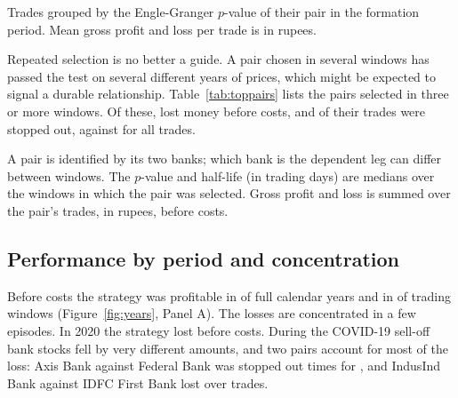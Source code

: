 \documentclass[11pt]{article}
\begin{document}
\begin{table}[tbp]
\centering
\caption{Trade outcomes by formation-period \texorpdfstring{$p$}{p}-value}
\label{tab:pvalue}
\small

\begin{tablenote}
Trades grouped by the Engle-Granger $p$-value of their pair in the formation period.
Mean gross profit and loss per trade is in rupees.
\end{tablenote}
\end{table}

Repeated selection is no better a guide. A pair chosen in several windows has passed
the test on several different years of prices, which might be expected to signal a
durable relationship. Table~\ref{tab:toppairs} lists the \NRepeat{} pairs selected
in three or more windows. Of these, \NRepeatLoss{} lost money before costs, and
\RepeatStopShare{} of their trades were stopped out, against \ShareStop{} for all
trades.

\begin{table}[tbp]
\centering
\caption{Pairs selected in three or more windows}
\label{tab:toppairs}
\footnotesize
\setlength{\tabcolsep}{4.5pt}

\begin{tablenote}
A pair is identified by its two banks; which bank is the dependent leg can differ
between windows. The $p$-value and half-life (in trading days) are medians over the
windows in which the pair was selected. Gross profit and loss is summed over the
pair's trades, in rupees, before costs.
\end{tablenote}
\end{table}

\subsection{Performance by period and concentration}\label{sec:periods}

Before costs the strategy was profitable in \NYearsPos{} of \NFullYears{} full calendar
years and in \NWindowsPos{} of \NWindows{} trading windows (Figure~\ref{fig:years},
Panel A). The losses are concentrated in a few episodes. In 2020 the strategy lost
\GrossTwentyTwenty{} before costs. During the COVID-19 sell-off bank stocks fell by
very different amounts, and two pairs account for most of the loss: Axis Bank
against Federal Bank was stopped out \AxisFedStops{} times for \rupee\AxisFedLoss{}, and
IndusInd Bank against IDFC First Bank lost \rupee\IndIdfcLoss{} over \IndIdfcTrades{}
trades.
\end{document}
